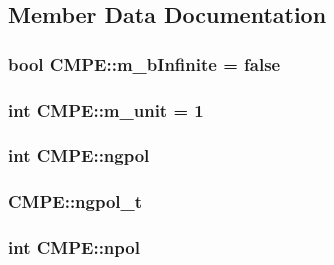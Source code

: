 \subsection{Member Data Documentation}
\hypertarget{classCMPE_a1c612f996b0be31759020f287d3ee7cc}{
\subsubsection[{m\-\_\-b\-Infinite}]{\setlength{\rightskip}{0pt plus 5cm}bool C\-M\-P\-E\-::m\-\_\-b\-Infinite = false\hspace{0.3cm}{\ttfamily [static]}}}\label{classCMPE_a1c612f996b0be31759020f287d3ee7cc}
\hypertarget{classCMPE_adf1757fa41fec1996e7ca1c7fe6fc9e0}{
\subsubsection[{m\-\_\-unit}]{\setlength{\rightskip}{0pt plus 5cm}int C\-M\-P\-E\-::m\-\_\-unit = 1\hspace{0.3cm}{\ttfamily [static]}}}\label{classCMPE_adf1757fa41fec1996e7ca1c7fe6fc9e0}
\hypertarget{classCMPE_a17b9196644f13740f99675a5a0d8ef23}{
\subsubsection[{ngpol}]{\setlength{\rightskip}{0pt plus 5cm}int C\-M\-P\-E\-::ngpol}}\label{classCMPE_a17b9196644f13740f99675a5a0d8ef23}
\hypertarget{classCMPE_afc7b0e78e954f7bb1419864a70c4d0b7}{
\subsubsection[{ngpol\-\_\-t}]{ C\-M\-P\-E\-::ngpol\-\_\-t}}\label{classCMPE_afc7b0e78e954f7bb1419864a70c4d0b7}
\hypertarget{classCMPE_a5e34c1f47c24748db2704af61b370fc0}{
\subsubsection[{npol}]{\setlength{\rightskip}{0pt plus 5cm}int C\-M\-P\-E\-::npol\hspace{0.3cm}{\ttfamily [static]}}}\label{classCMPE_a5e34c1f47c24748db2704af61b370fc0}
